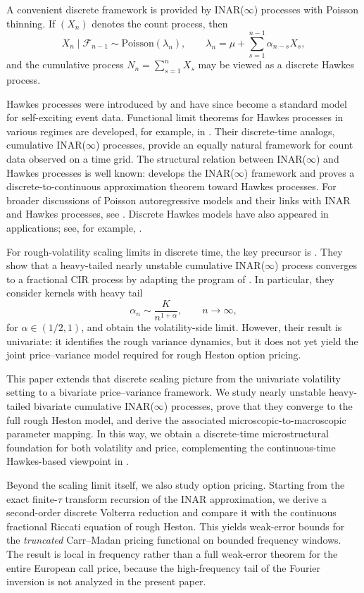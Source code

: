 \documentclass[letterpaper]{article}
\numberwithin{equation}{section}
\theoremstyle{definition}
\theoremstyle{remark}
\begin{document}
A convenient discrete framework is provided by INAR($\infty$) processes with Poisson thinning. If $(X_n)$ denotes the count process, then
\[
X_n\mid\mathcal F_{n-1}\sim \mathrm{Poisson}(\lambda_n),\qquad
\lambda_n=\mu+\sum_{s=1}^{n-1}\alpha_{n-s}X_s,
\]
and the cumulative process $N_n=\sum_{s=1}^n X_s$ may be viewed as a discrete Hawkes process.

Hawkes processes were introduced by \cite{hawkes1971spectra} and have since become a standard model for self-exciting event data. Functional limit theorems for Hawkes processes in various regimes are developed, for example, in \cite{bacry2013some,horst2026functional}. Their discrete-time analogs, cumulative INAR($\infty$) processes, provide an equally natural framework for count data observed on a time grid. The structural relation between INAR($\infty$) and Hawkes processes is well known: \cite{kirchner2016hawkes} develops the INAR($\infty$) framework and proves a discrete-to-continuous approximation theorem toward Hawkes processes. For broader discussions of Poisson autoregressive models and their links with INAR and Hawkes processes, see \cite{fokianos2021multivariate,huang2023nonlinear}. Discrete Hawkes models have also appeared in applications; see, for example, \cite{xu2022self}.

For rough-volatility scaling limits in discrete time, the key precursor is \cite{wang2026scaling}. They show that a heavy-tailed nearly unstable cumulative INAR($\infty$) process converges to a fractional CIR process by adapting the program of \cite{jaisson2016rough}. In particular, they consider kernels with heavy tail
\[
  \alpha_n\sim \frac{K}{n^{1+\alpha}},
  \qquad n\to\infty,
\]
for $\alpha\in(1/2,1)$, and obtain the volatility-side limit. However, their result is univariate: it identifies the rough variance dynamics, but it does not yet yield the joint price--variance model required for rough Heston option pricing.

This paper extends that discrete scaling picture from the univariate volatility setting to a bivariate price--variance framework. We study nearly unstable heavy-tailed bivariate cumulative INAR($\infty$) processes, prove that they converge to the full rough Heston model, and derive the associated microscopic-to-macroscopic parameter mapping. In this way, we obtain a discrete-time microstructural foundation for both volatility and price, complementing the continuous-time Hawkes-based viewpoint in \cite{el2018microstructural,horst2022microstructure}.

Beyond the scaling limit itself, we also study option pricing. Starting from the exact finite-$\tau$ transform recursion of the INAR approximation, we derive a second-order discrete Volterra reduction and compare it with the continuous fractional Riccati equation of rough Heston. This yields weak-error bounds for the \emph{truncated} Carr--Madan pricing functional on bounded frequency windows. The result is local in frequency rather than a full weak-error theorem for the entire European call price, because the high-frequency tail of the Fourier inversion is not analyzed in the present paper.
\end{document}

